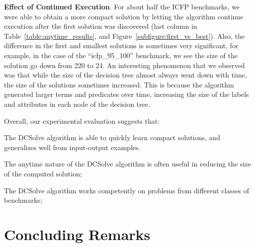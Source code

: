 \documentclass{llncs}
\newcommand{\dcsolve}{{\sffamily\fontsize{8.5}{10}\selectfont
    DCSolve}\xspace}
\renewcommand{\paragraph}[1]{\par\noindent\textbf{#1}.}
\begin{document}
\paragraph{Effect of Continued Execution}
For about half the ICFP benchmarks, we were able to obtain a more
compact solution by letting the algorithm continue execution after the
first solution was discovered (last column in
Table~\ref{table:anytime_results}, and Figure~\ref{subfigure:first_vs_best}).
Also, the difference in the first and
smallest solutions is sometimes very significant, for example, in the
case of the ``icfp\_95\_100'' benchmark, we see the size of the
solution go down from 220 to 24.
An interesting phenomenon that we observed was that while the size of
the decision tree almost always went down with time, the size of the
solutions sometimes increased.
This is because the algorithm generated larger terms and predicates
over time, increasing the size of the labels and attributes in each node
of the decision tree.


Overall, our experimental evaluation suggests that:
\begin{inparaenum}[(a)]
\item
The \dcsolve algorithm is able to quickly learn compact solutions,
and generalizes well from input-output examples.
\item
The anytime nature of the \dcsolve algorithm is often useful in
reducing the size of the computed solution;
\item
The \dcsolve algorithm works competently on problems from different
classes of benchmarks;
\end{inparaenum}

\section{Concluding Remarks}
\label{sec:conclusion}
\end{document}
